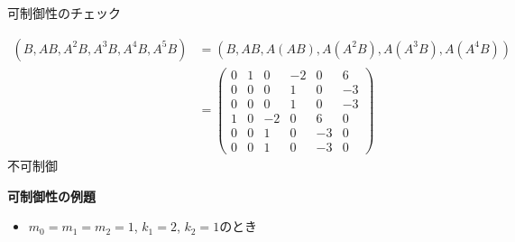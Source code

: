 \documentclass[a4paper,11pt,fleqn]{jreport}
\begin{document}
可制御性のチェック

\begin{align}
 (B,AB, A^2B, A^3B, A^4B, A^5B)
 &=
 (B,AB, A(AB), A(A^2B), A(A^3B), A(A^4B))
\nonumber \\
 &=
 \left(\begin{array}{rrrrrr}
        0 & 1 & 0 & -2& 0 & 6      \\
        0 & 0 & 0 & 1 & 0 & -3      \\
        0 & 0 & 0 & 1 & 0 & -3      \\
	1 & 0 & -2& 0 & 6 & 0 \\
	0 & 0 & 1 & 0 & -3& 0 \\
	0 & 0 & 1 & 0 & -3& 0 
       \end{array}\right)
\nonumber
\end{align}
不可制御

\newpage
\noindent
{\bf 可制御性の例題}

\begin{itemize}
\item $m_0=m_1=m_2=1$, $k_1=2$, $k_2=1$のとき
\end{itemize}
\end{document}
